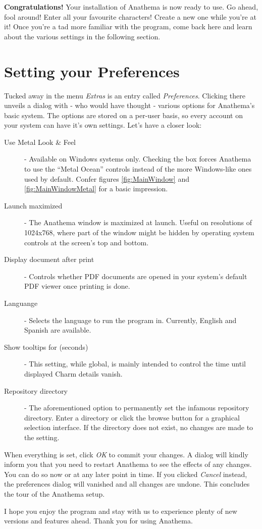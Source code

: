 \textbf{Congratulations!} Your installation of Anathema is now ready to use. Go ahead, fool around! Enter all your favourite characters! Create a new one while you're at it!
\medskip
\newline
Once you're a tad more familiar with the program, come back here and learn about the various settings in the following section.

\section{Setting your Preferences}\label{sec:Preferences}
Tucked away in the menu \emph{Extras} is an entry called \emph{Preferences}. Clicking there unveils a dialog with - who would have thought - various options for Anathema's basic system. The options are stored on a per-user basis, so every account on your system can have it's own settings. Let's have a closer look:
\begin{description}
	\item[Use Metal Look \& Feel] - Available on Windows systems only. Checking the box forces Anathema to use the ``Metal Ocean'' controls instead of the more Windows-like ones used by default. Confer figures \ref{fig:MainWindow} and \ref{fig:MainWindowMetal} for a basic impression.
	\item[Launch maximized] - The Anathema window is maximized at launch. Useful on resolutions of 1024x768, where part of the window might be hidden by operating system controls at the screen's top and bottom.
	\item[Display document after print] - Controls whether PDF documents are opened in your system's default PDF viewer once printing is done.
	\item[Languange] - Selects the language to run the program in. Currently, English and Spanish are available.
	\item[Show tooltips for (seconds)] - This setting, while global, is mainly intended to control the time until displayed Charm details vanish. 
	\item[Repository directory] - The aforementioned option to permanently set the infamous repository directory. Enter a directory or click the browse button for a graphical selection interface. If the directory does not exist, no changes are made to the setting.
\end{description}
	
When everything is set, click \emph{OK} to commit your changes. A dialog will kindly inform you that you need to restart Anathema to see the effects of any changes. You can do so now or at any later point in time. If you clicked \emph{Cancel} instead, the preferences dialog will vanished and all changes are undone.
\medskip
\newline
This concludes the tour of the Anathema setup.

I hope you enjoy the program and stay with us to experience plenty of new versions and features ahead.
\medskip
\newline
Thank you for using Anathema.
